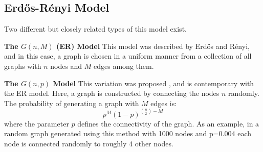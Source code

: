\subsection{Erd{\H{o}}s-R{\'e}nyi Model}


Two different but closely related types of this model exist. 

\textbf{The $G(n, M)$ (ER) Model} This model was described by Erd{\H{o}}s and R{\'e}nyi,
and in this case, a graph is chosen in a uniform manner from a collection of all
graphs with $n$ nodes and $M$ edges among them. 

\textbf{The $G(n, p)$ Model} This variation was proposed \citet{article:gilber}, and is
contemporary with the ER model. Here, a graph is constructed by connecting the nodes $n$
randomly. The probability of generating a graph with $M$ edges is:
\begin{equation}
  \label{eq:er}
  p^{M}(1-p)^{\binom{n}{2}-M}
\end{equation}
where the parameter $p$ defines the connectivity of the graph. As an example,
in a random graph generated using this method with 1000 nodes and p=0.004 each node
is connected randomly to roughly 4 other nodes. 